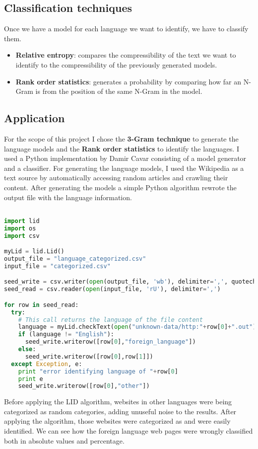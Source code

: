 \subsection{Classification techniques}
Once we have a model for each language we want to identify, we have to classify them.
\begin{itemize}
  \item {\bf Relative entropy}: compares the compressibility of the text we want to identify to the compressibility of the previously generated models.
  \item {\bf Rank order statistics}: generates a probability by comparing how far an N-Gram is from the position of the same N-Gram in the model.
\end{itemize}
\subsection{Application}
For the scope of this project I chose the {\bf 3-Gram technique} to generate the language models and the {\bf Rank order statistics} to identify the languages. I used a Python implementation by Damir Cavar\cite{lid1} consisting of a model generator and a classifier.
For generating the language models, I used the Wikipedia as a text source by automatically accessing random articles and crawling their content. After generating the models a simple Python algorithm rewrote the output file with the language information.

\begin{lstlisting}[language=Python]

import lid
import os
import csv

myLid = lid.Lid()
output_file = "language_categorized.csv"
input_file = "categorized.csv"

seed_write = csv.writer(open(output_file, 'wb'), delimiter=',', quotechar='|', quoting=csv.QUOTE_MINIMAL)
seed_read = csv.reader(open(input_file, 'rU'), delimiter=',')

for row in seed_read:
  try:
    # This call returns the language of the file content
    language = myLid.checkText(open("unknown-data/http:"+row[0]+".out").read())
    if (language != "English"):
      seed_write.writerow([row[0],"foreign_language"])
    else:
      seed_write.writerow([row[0],row[1]])
  except Exception, e:
    print "error identifying language of "+row[0]
    print e
    seed_write.writerow([row[0],"other"])
\end{lstlisting}

Before applying the LID algorithm, websites in other languages were being categorized as random categories, adding unuseful noise to the results. After applying the algorithm, those websites were categorized as  and were easily identified. We can see how the foreign language web pages were wrongly classified both in absolute values and percentage.

